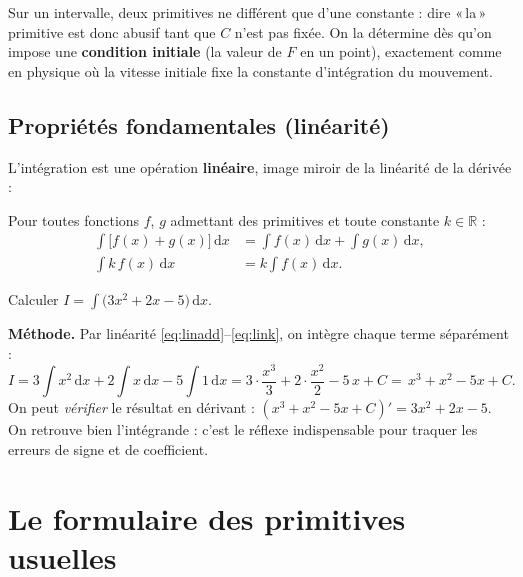 \documentclass[11pt,a4paper]{article}
\newcommand{\dd}{\mathrm{d}}
\newcommand{\R}{\mathbb{R}}
\begin{document}
\begin{remarque}
Sur un intervalle, deux primitives ne différent que d'une constante : dire «\,la\,» primitive est
donc abusif tant que $C$ n'est pas fixée. On la détermine dès qu'on impose une
\textbf{condition initiale} (la valeur de $F$ en un point), exactement comme en physique où la
vitesse initiale fixe la constante d'intégration du mouvement.
\end{remarque}

\subsection{Propriétés fondamentales (linéarité)}

L'intégration est une opération \textbf{linéaire}, image miroir de la linéarité de la dérivée :

\begin{theoreme}
Pour toutes fonctions $f$, $g$ admettant des primitives et toute constante $k\in\R$ :
\begin{align}
\int \bigl[f(x)+g(x)\bigr]\,\dd x &= \int f(x)\,\dd x+\int g(x)\,\dd x, \label{eq:linadd}\\
\int k\,f(x)\,\dd x &= k\int f(x)\,\dd x. \label{eq:link}
\end{align}
\end{theoreme}

\begin{exemple}
Calculer $\displaystyle I=\int\bigl(3x^2+2x-5\bigr)\,\dd x$.

\smallskip
\textbf{Méthode.} Par linéarité \eqref{eq:linadd}--\eqref{eq:link}, on intègre chaque terme séparément :
\[
I=3\int x^2\,\dd x+2\int x\,\dd x-5\int 1\,\dd x
 =3\cdot\frac{x^{3}}{3}+2\cdot\frac{x^{2}}{2}-5\,x+C
 =\boxed{\,x^{3}+x^{2}-5x+C.\,}
\]
On peut \emph{vérifier} le résultat en dérivant : $(x^3+x^2-5x+C)'=3x^2+2x-5$. On retrouve bien
l'intégrande : c'est le réflexe indispensable pour traquer les erreurs de signe et de coefficient.
\end{exemple}

\section{Le formulaire des primitives usuelles}
\end{document}
